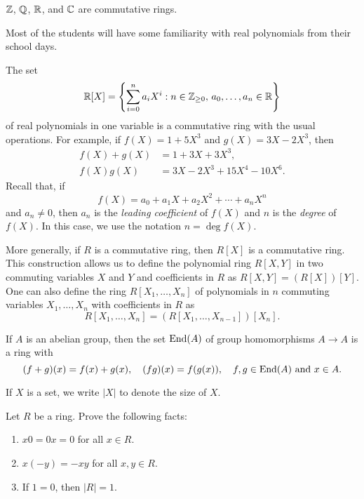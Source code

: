 \begin{example}
$\mathbb{Z}$, $\mathbb{Q}$, $\mathbb{R}$, and $\mathbb{C}$ are commutative rings.
\end{example}

Most of the students will have some familiarity with
real polynomials from their school days. 

\begin{example}
    The set  
    \[
		\mathbb{R}[X]=\left\{\sum_{i=0}^na_iX^i:n\in\mathbb{Z}_{\geq0},\,a_0,\dots,a_n\in \mathbb{R}\right\}
    \]
    of real polynomials in one variable 
    is a commutative ring with the usual operations.  
    For example, if $f(X)=1+5X^3$ and $g(X)=3X-2X^3$, then
    \begin{align*}
        f(X)+g(X) &= 1+3X+3X^3,\\
        f(X)g(X) &= 3X-2X^3+15X^4-10X^6.
    \end{align*}
    Recall that, if 
    \[
    f(X)=a_0+a_1X+a_2X^2+\cdots+a_nX^n
    \]
    and $a_n\ne0$, then $a_n$ is the \emph{leading coefficient} of $f(X)$ and 
    $n$ is the \emph{degree} of $f(X)$. In this case, we use the notation 
    $n=\deg f(X)$. 
\end{example}

More generally, if $R$ is a commutative ring, then $R[X]$ is a commutative ring. This construction
allows us to define 
the polynomial ring $R[X,Y]$ in two commuting variables $X$ and $Y$ and coefficients in $R$ as 
$R[X,Y]=(R[X])[Y]$. One can also define the ring  
$R[X_1,\dots,X_n]$ of polynomials 
in $n$ commuting variables $X_1,\dots,X_n$ with coefficients in $R$ as 
\[
R[X_1,\dots,X_n]
=(R[X_1,\dots,X_{n-1}])[X_n].
\]

\begin{example}
    If $A$ is an abelian group, then 
    the set 
    $\operatorname{End}(A)$ of group homomorphisms $A\to A$ is a ring with
    \[
    (f+g)(x)=f(x)+g(x),\quad
    (fg)(x)=f(g(x)),\quad f,g\in\operatorname{End}(A)\text{ and }x\in A.
    \]
\end{example}

If $X$ is a set, we write $|X|$ to denote 
the size of $X$. 

\begin{exercise}
Let $R$ be a ring. Prove the following facts: 
\begin{enumerate}
    \item $x0=0x=0$ for all $x\in R$.
    \item $x(-y)=-xy$ for all $x,y\in R$.
    \item If $1=0$, then $|R|=1$. 
\end{enumerate}
\end{exercise}

